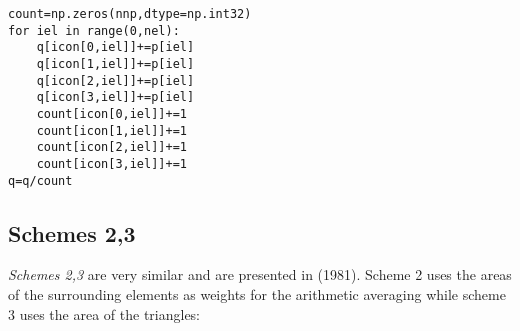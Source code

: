 \begin{lstlisting}
count=np.zeros(nnp,dtype=np.int32)  
for iel in range(0,nel):
    q[icon[0,iel]]+=p[iel]
    q[icon[1,iel]]+=p[iel]
    q[icon[2,iel]]+=p[iel]
    q[icon[3,iel]]+=p[iel]
    count[icon[0,iel]]+=1
    count[icon[1,iel]]+=1
    count[icon[2,iel]]+=1
    count[icon[3,iel]]+=1
q=q/count
\end{lstlisting}

\subsection{Schemes 2,3}

{\sl Schemes 2,3} are very similar and are presented in \textcite{sagl81a,sagl81b} (1981).
Scheme 2 uses the areas of the surrounding elements as weights for the arithmetic averaging
while scheme 3 uses the area of the triangles:

